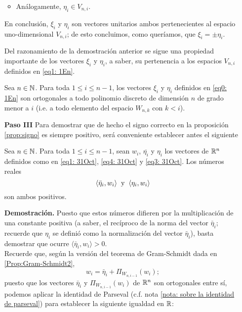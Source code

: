 \begin{itemize}
\begin{itemize}
\item Análogamente, $\eta_{i} \in V_{n,i}$.
\end{itemize}

En conclusión, $\xi_{i}$ y $\eta_{i}$ 
son vectores unitarios ambos pertenecientes al espacio
uno-dimensional $V_{n,i}$; de esto concluimos, como
queríamos, que $\xi_{i} = \pm \eta_{i} $. \QEDB
\vspace{0.2cm}


Del razonamiento de la demostración anterior se sigue una propiedad
importante de los vectores $\xi_{i}$ y $\eta_{i}$,
a saber, su pertenencia a los espacios $V_{n,i}$
definidos en \eqref{eq1: 1En}.

\begin{cor} \label{cor: xi y eta ortogonales a elementos de...}
Sea $n \in \mathbb{N}$.
Para toda $1 \leq i \leq n-1$, los vectores 
$\xi_{i}$ y $\eta_{i}$ definidos en \eqref{eq0: 1En}
son ortogonales a todo polinomio
discreto de dimensión $n$ 
de grado menor a $i$ (i.e. a todo elemento
del espacio $W_{n,k}$ con $k < i$).
\end{cor}




\item[\textbf{Paso III}] Para demostrar que de hecho 
el signo correcto en la
proposición \ref{prop:signo} es siempre positivo, 
será conveniente
establecer antes el siguiente

\begin{lema} \label{Lema1}
Sea $n \in \mathbb{N}$. 
Para toda
$1 \leq i \leq n-1$, 
sean $w_{i}$, $\overline{\eta_{i}}$ y $\eta_{i}$ los vectores
de $\mathbb{R}^{n}$ definidos como en 
\eqref{eq1: 31Oct},
\eqref{eq4: 31Oct} y
\eqref{eq3: 31Oct}.
Los números reales
\[
\langle \bar{\eta}_{i} , w_{i} \rangle \hspace{0.2cm}
\text{y} \hspace{0.2cm} \langle \eta_{i} , w_{i} \rangle 
\]
son ambos positivos.
\end{lema}
\noindent
\textbf{Demostración.}
Puesto que estos números difieren por la multiplicación
de una constante positiva
(a saber, el recíproco de la norma
del vector $\bar{\eta}_{i}$;
recuerde que $\eta_{i}$
se definió como la normalización
del vector $\bar{\eta}_{i}$), basta demostrar que 
ocurre $\langle\bar{\eta}_{i}, w_{i} \rangle >0$. \\
Recuerde que, según la versión del 
teorema de Gram-Schmidt dada en \ref{Prop:Gram-Schmidt2},
\[
w_{i}= \bar{\eta}_{i} + \Pi_{W_{n,i-1}}(w_{i});
\]
puesto que los vectores $\bar{\eta}_{i}$
y $\Pi_{W_{n,i-1}}(w_{i})$ de $\mathbb{R}^{n}$  son ortogonales entre sí, 
podemos
aplicar la identidad de Parseval (c.f. 
nota \ref{nota: sobre la identidad de parseval})
para establecer la siguiente igualdad en $\mathbb{R}$:


\end{itemize}
